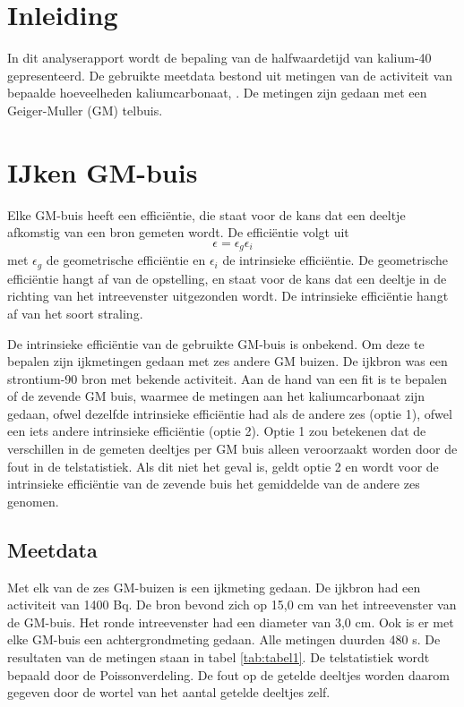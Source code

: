 \documentclass[11pt,a4paper]{article}
\begin{document}
\suppressfloats[t]      %


\section{Inleiding}
In dit analyserapport wordt de bepaling van de halfwaardetijd van kalium-40 gepresenteerd. De gebruikte meetdata bestond uit metingen van de activiteit van bepaalde hoeveelheden kaliumcarbonaat, . De metingen zijn gedaan met een Geiger-Muller (GM) telbuis.

\section{IJken GM-buis}

Elke GM-buis heeft een efficiëntie, die staat voor de kans dat een deeltje afkomstig van een bron gemeten wordt. De efficiëntie volgt uit
\begin{equation}
\epsilon = \epsilon_g \epsilon_i
\label{eq:efficientie}
\end{equation}
met $\epsilon_g$ de geometrische efficiëntie en $\epsilon_i$ de intrinsieke efficiëntie. De geometrische efficiëntie hangt af van de opstelling, en staat voor de kans dat een deeltje in de richting van het intreevenster uitgezonden wordt. De intrinsieke efficiëntie hangt af van het soort straling.

De intrinsieke efficiëntie van de gebruikte GM-buis is onbekend. Om deze te bepalen zijn ijkmetingen gedaan met zes andere GM buizen. De ijkbron was een strontium-90 bron met bekende activiteit. Aan de hand van een fit is te bepalen of de zevende GM buis, waarmee de metingen aan het kaliumcarbonaat zijn gedaan, ofwel dezelfde intrinsieke efficiëntie had als de andere zes (optie 1), ofwel een iets andere intrinsieke efficiëntie (optie 2). Optie 1 zou betekenen dat de verschillen in de gemeten deeltjes per GM buis alleen veroorzaakt worden door de fout in de telstatistiek. Als dit niet het geval is, geldt optie 2 en wordt voor de intrinsieke efficiëntie van de zevende buis het gemiddelde van de andere zes genomen.

\subsection{Meetdata}
Met elk van de zes GM-buizen is een ijkmeting gedaan. De ijkbron had een activiteit van 1400 Bq. De bron bevond zich op 15,0 cm van het intreevenster van de GM-buis. Het ronde intreevenster had een diameter van 3,0 cm. Ook is er met elke GM-buis een achtergrondmeting gedaan. Alle metingen duurden 480 s. De resultaten van de metingen staan in tabel \ref{tab:tabel1}. De telstatistiek wordt bepaald door de Poissonverdeling. De fout op de getelde deeltjes worden daarom gegeven door de wortel van het aantal getelde deeltjes zelf.
\end{document}
